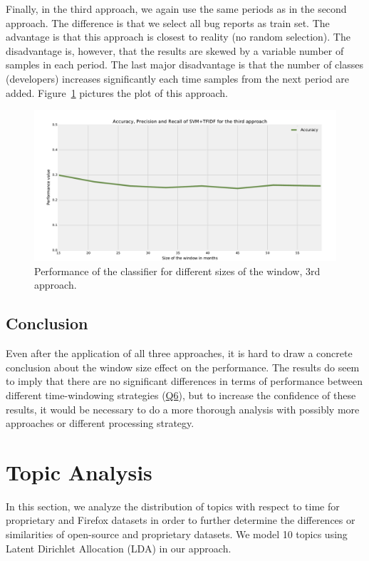 Finally, in the third approach, we again use the same periods as in the second approach. The difference is that we select all bug reports as train set. The advantage is that this approach is closest to reality (no random selection). The disadvantage is, however, that the results are skewed by a variable number of samples in each period. The last major disadvantage is that the number of classes (developers) increases significantly each time samples from the next period are added. Figure~\ref{fig:window.firefox.3a} pictures the plot of this approach.

\begin{figure}[htbp]
    \centering
        \includegraphics[width=\textwidth]{./images/window_size/firefox_3a.pdf}
    \caption{Performance of the classifier for different sizes of the window, 3rd approach.}
    \label{fig:window.firefox.3a}
\end{figure}

\subsection{Conclusion}

Even after the application of all three approaches, it is hard to draw a concrete conclusion about the window size effect on the performance. The results do seem to imply that there are no significant differences in terms of performance between different time-windowing strategies (\hyperlink{question:6}{Q6}), but to increase the confidence of these results, it would be necessary to do a more thorough analysis with possibly more approaches or different processing strategy.

\section{Topic Analysis}

In this section, we analyze the distribution of topics with respect to time for proprietary and Firefox datasets in order to further determine the differences or similarities of open-source and proprietary datasets. We model 10 topics using Latent Dirichlet Allocation (LDA) in our approach.

